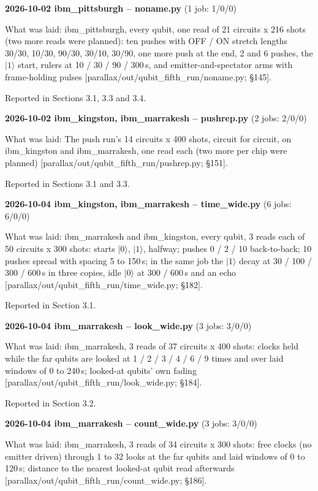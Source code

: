\documentclass[11pt]{article}
\begin{document}
\textbf{2026-10-02 ibm\_pittsburgh -- noname.py} (1 job: 1/0/0)

What was laid: ibm\_pittsburgh, every qubit, one read of 21 circuits x 216 shots (two more reads were planned): ten pushes with OFF / ON stretch lengths 30/30, 10/30, 90/30, 30/10, 30/90, one more push at the end, 2 and 6 pushes, the \(|1\rangle\) start, rulers at 10 / 30 / 90 / 300\,\textmu s, and emitter-and-spectator arms with frame-holding pulses {[}parallax/out/qubit\_fifth\_run/noname.py; \S{}145{]}.

Reported in Sections 3.1, 3.3 and 3.4.

\textbf{2026-10-02 ibm\_kingston, ibm\_marrakesh -- pushrep.py} (2 jobs: 2/0/0)

What was laid: The push run's 14 circuits x 400 shots, circuit for circuit, on ibm\_kingston and ibm\_marrakesh, one read each (two more per chip were planned) {[}parallax/out/qubit\_fifth\_run/pushrep.py; \S{}151{]}.

Reported in Sections 3.1 and 3.3.

\textbf{2026-10-04 ibm\_kingston, ibm\_marrakesh -- time\_wide.py} (6 jobs: 6/0/0)

What was laid: ibm\_marrakesh and ibm\_kingston, every qubit, 3 reads each of 50 circuits x 300 shots: starts \(|0\rangle\), \(|1\rangle\), halfway; pushes 0 / 2 / 10 back-to-back; 10 pushes spread with spacing 5 to 150\,\textmu s; in the same job the \(|1\rangle\) decay at 30 / 100 / 300 / 600\,\textmu s in three copies, idle \(|0\rangle\) at 300 / 600\,\textmu s and an echo {[}parallax/out/qubit\_fifth\_run/time\_wide.py; \S{}182{]}.

Reported in Section 3.1.

\textbf{2026-10-04 ibm\_marrakesh -- look\_wide.py} (3 jobs: 3/0/0)

What was laid: ibm\_marrakesh, 3 reads of 37 circuits x 400 shots: clocks held while the far qubits are looked at 1 / 2 / 3 / 4 / 6 / 9 times and over laid windows of 0 to 240\,\textmu s; looked-at qubits' own fading {[}parallax/out/qubit\_fifth\_run/look\_wide.py; \S{}184{]}.

Reported in Section 3.2.

\textbf{2026-10-04 ibm\_marrakesh -- count\_wide.py} (3 jobs: 3/0/0)

What was laid: ibm\_marrakesh, 3 reads of 34 circuits x 300 shots: free clocks (no emitter driven) through 1 to 32 looks at the far qubits and laid windows of 0 to 120\,\textmu s; distance to the nearest looked-at qubit read afterwards {[}parallax/out/qubit\_fifth\_run/count\_wide.py; \S{}186{]}.
\end{document}
